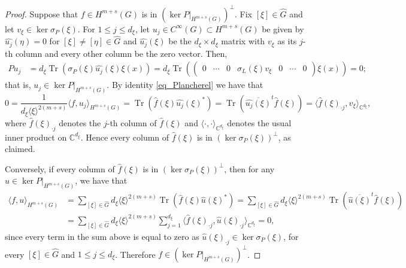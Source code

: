 \documentclass[11pt]{amsart}
\numberwithin{theorem}{section}
\numberwithin{equation}{section}
\theoremstyle{definition}
\numberwithin{example}{section}
\theoremstyle{definition}
\theoremstyle{definition}
\newcommand{\C}{\mathbb{C}}
\newcommand{\Tr}{\operatorname{Tr}}
\begin{document}
\begin{proof}
    
Suppose that $f\in H^{m+s}(G)$ is in $(\ker P|_{H^{m+s}(G)})^{\perp}$. Fix $[\xi]\in\widehat{G}$ and let $v_\xi \in \ker \sigma_P({\xi})$. For $1\leq j\leq d_\xi$, let $u_j\in C^\infty(G)\subset {H^{m+s}(G)}$ be given by $\widehat{u_j}(\eta)=0$ for $[{\xi}]\neq [\eta]\in\widehat{G}$ and $\widehat{u_j}({\xi})$ be the $d_\xi\times d_\xi$ matrix  with $v_\xi$ as its $j$-th column and every other column be the zero vector. Then,
\begin{align*}
    Pu_j&=d_{\xi} \Tr(\sigma_{P}({\xi})\widehat{u_j}(\xi){\xi}(x))=d_{\xi}\Tr\left(\begin{pmatrix}
        0&\cdots&0& \sigma_{L}({\xi})v_\xi&0&\cdots&0
    \end{pmatrix}{\xi}(x)\right)=0;
\end{align*}
that is, $u_j\in \ker P|_{H^{m+s}(G)}$.
By identity \eqref{eq_Plancherel} we have that
    \begin{equation*}
        0=\frac{1}{d_\xi\langle \xi\rangle^{2(m+s)}} \langle f,u_j\rangle_{H^{m+s}(G)} = \Tr (\widehat{f}({\xi})\widehat{u_j}({\xi})^*)=\Tr (\overline{\widehat{u_j}({\xi})}^t\widehat{f}({\xi}))=\langle \widehat{f}({\xi})_{\cdot j},v_\xi\rangle_{\C^{d_\xi}},
    \end{equation*}
    where $\widehat{f}({\xi})_{\cdot j}$ denotes the $j$-th column of $\widehat{f}({\xi})$ and $\langle \cdot ,\cdot\rangle_{\C^{d_\xi}}$ denotes the usual inner product on $\C^{d_\xi}$. Hence every column of $\widehat{f}({\xi})$ is in $(\ker \sigma_{P}({\xi}))^\perp$, as claimed.
    
    Conversely, if  every column of $\widehat{f}(\xi)$ is in $(\ker \sigma_{P}(\xi))^\perp$, then for any $u\in \ker P|_{H^{m+s}(G)}$, we have that 
    \begin{align*}
        \langle f,u\rangle_{H^{m+s}(G)}&=\sum_{[\xi]\in\widehat{G}} d_\xi \langle \xi\rangle^{2(m+s)} \Tr(\widehat{f}(\xi)\widehat{u}({\xi})^*)=\sum_{[\xi]\in\widehat{G}} d_\xi \langle \xi\rangle^{2(m+s)}\Tr(\overline{\widehat{u}({\xi})}^t\widehat{f}(\xi))\\
        &=\sum_{[\xi]\in\widehat{G}} d_\xi\langle \xi\rangle^{2(m+s)}\sum_{j=1}^{d_\xi}\langle \widehat{f}({\xi})_{\cdot j},\widehat{u}({\xi})_{\cdot j}\rangle_{\C^{d_\xi}}=0,
    \end{align*}
    since every term in the sum above is equal to zero as $\widehat{u}({\xi})_{\cdot j}\in \ker \sigma_P(\xi)$, for every $[\xi]\in\widehat{G}$ and $1\leq j\leq d_\xi$. Therefore $f\in (\ker P|_{H^{m+s}(G)})^{\perp}$.
\end{proof}
\end{document}
